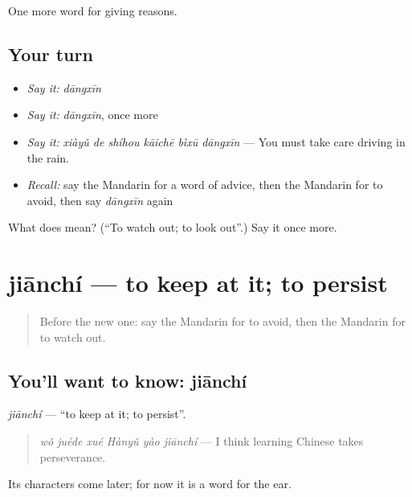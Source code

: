 \begin{grammarlens}[title={What you've built}]
One more word for giving reasons.
\end{grammarlens}

\subsection*{Your turn}
\begin{itemize}
\raggedright
  \item \emph{Say it:} \emph{dāngxīn}
  \item \emph{Say it:} \emph{dāngxīn}, once more
  \item \emph{Say it:} \emph{xiàyǔ de shíhou kāichē bìxū dāngxīn} — You must take care driving in the rain.
  \item \emph{Recall:} say the Mandarin for a word of advice, then the Mandarin for to avoid, then say \emph{dāngxīn} again
\end{itemize}

\begin{tcolorbox}[breakable,colback=teal!4,colframe=teal!35!black,title={Before you move on}]
What does  mean? (\textquotedblleft{}To watch out; to look out\textquotedblright{}.) Say it once more.
\end{tcolorbox}
\section[jiānchí]{jiānchí — to keep at it; to persist}

\label{lesson:ZH-C366-jianchi}



\begin{quote}
Before the new one: say the Mandarin for to avoid, then the Mandarin for to watch out.
\end{quote}

\subsection*{You'll want to know: jiānchí}
\emph{jiānchí} — \textquotedblleft{}to keep at it; to persist\textquotedblright{}.

\begin{quote}
\emph{wǒ juéde xué Hànyǔ yào jiānchí} — I think learning Chinese takes perseverance.
\end{quote}

Its characters come later; for now it is a word for the ear.

